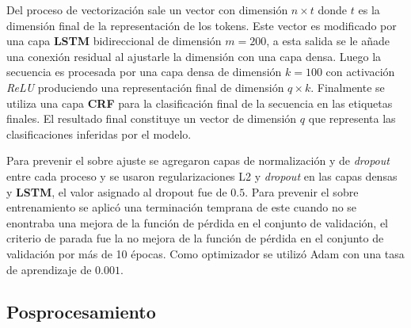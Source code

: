 Del proceso de vectorización sale un vector con dimensión $n \times t$ donde $t$ es la dimensión final de la representación
de los tokens. Este vector es modificado por una capa \textbf{LSTM} bidireccional de dimensión $m=200$, a esta salida se le 
añade una conexión residual al ajustarle la dimensión con una capa densa. Luego la secuencia es procesada por una 
capa densa de dimensión $k=100$ con activación \emph{ReLU} produciendo una representación final de dimensión 
$q \times k$. Finalmente se utiliza una capa \textbf{CRF}
para la clasificación final de la secuencia en las etiquetas finales. El resultado final constituye un vector
de dimensión $q$ que representa las clasificaciones inferidas por el modelo.

Para prevenir el sobre ajuste se agregaron capas de normalización y de \emph{dropout} entre cada proceso y se usaron regularizaciones
L2 y \emph{dropout} en las capas densas y \textbf{LSTM}, el valor asignado al dropout fue de $0.5$. 
Para prevenir el sobre entrenamiento se aplicó una 
terminación temprana de este cuando no se enontraba una mejora de la función de pérdida en el conjunto de validación,
el criterio de parada fue la no mejora de la función de pérdida en el conjunto de validación por más de 10 épocas.
Como optimizador se utilizó Adam con una tasa de aprendizaje de $0.001$.

\subsection{Posprocesamiento}

